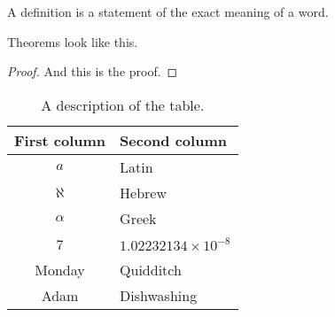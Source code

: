 \begin{definition}
 A definition is a statement of the exact meaning of a word.
\end{definition}


\begin{theorem}
 Theorems look like this. 
\end{theorem}
\begin{proof}
 And this is the proof.
\end{proof}

\begin{table}
\centering
\begin{tabular}{|c|l|}
\hline
First column & Second column\\\hline
$a$          & Latin \\
$\aleph$     & Hebrew \\
$\alpha$     & Greek \\
7            & $1.02232134\times10^{-8}$\\
Monday       & Quidditch\\
Adam         & Dishwashing\\
\hline
\end{tabular}
\caption{A description of the table.} 

\label{Tab1}
\end{table}

